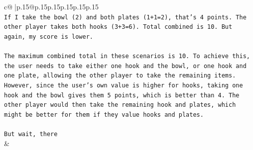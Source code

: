 \documentclass{article}
\begin{document}
{\begin{supertabular}{c@{$\;$}|p{.15\linewidth}@{}p{.15\linewidth}p{.15\linewidth}p{.15\linewidth}p{.15\linewidth}p{.15\linewidth}}
{{{\\ 
\texttt{If I take the bowl (2) and both plates (1+1=2), that's 4 points. The other player takes both hooks (3+3=6). Total combined is 10. But again, my score is lower.} \\
\\ 
\texttt{The maximum combined total in these scenarios is 10. To achieve this, the user needs to take either one hook and the bowl, or one hook and one plate, allowing the other player to take the remaining items. However, since the user's own value is higher for hooks, taking one hook and the bowl gives them 5 points, which is better than 4. The other player would then take the remaining hook and plates, which might be better for them if they value hooks and plates.} \\
\\ 
\texttt{But wait, there} \\
            }
        }
    }
    & \\ \\


\end{supertabular}}
\end{document}
